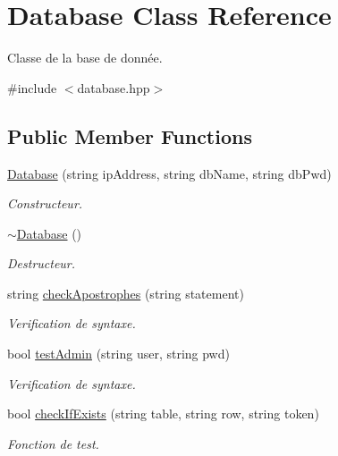 \hypertarget{classDatabase}{}\section{Database Class Reference}
\label{classDatabase}


Classe de la base de donnée.  




{\ttfamily \#include $<$database.\+hpp$>$}

\subsection*{Public Member Functions}
\begin{DoxyCompactItemize}
\item 
\mbox{\hyperlink{classDatabase_a95206f04bf344b042799c9bed2bc29ad}{Database}} (string ip\+Address, string db\+Name, string db\+Pwd)
\begin{DoxyCompactList}\small\item\em Constructeur. \end{DoxyCompactList}\item 
\mbox{\hyperlink{classDatabase_a84d399a2ad58d69daab9b05330e1316d}{$\sim$\+Database}} ()
\begin{DoxyCompactList}\small\item\em Destructeur. \end{DoxyCompactList}\item 
string \mbox{\hyperlink{classDatabase_aa3d736693ce3f873f29078c89c57df93}{check\+Apostrophes}} (string statement)
\begin{DoxyCompactList}\small\item\em Verification de syntaxe. \end{DoxyCompactList}\item 
bool \mbox{\hyperlink{classDatabase_aab00e57287fe5e19c727c6cd2cadc154}{test\+Admin}} (string user, string pwd)
\begin{DoxyCompactList}\small\item\em Verification de syntaxe. \end{DoxyCompactList}\item 
bool \mbox{\hyperlink{classDatabase_adbff1128a3de654905631045f56955f0}{check\+If\+Exists}} (string table, string row, string token)
\begin{DoxyCompactList}\small\item\em Fonction de test. \end{DoxyCompactList}\item 

\end{DoxyCompactItemize}
